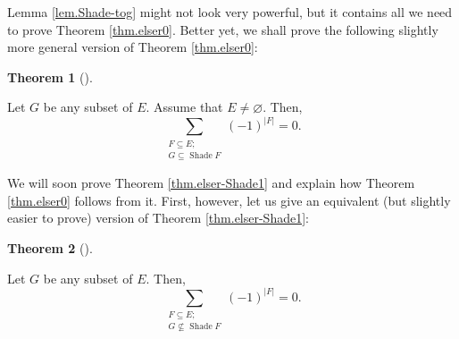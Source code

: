 \documentclass[numbers=enddot,12pt,final,onecolumn]{scrartcl}%
\theoremstyle{definition}
\newtheorem{theo}{Theorem}[section]
\newenvironment{theorem}[1][]
{\begin{theo}[#1]\begin{leftbar}}
{\end{leftbar}\end{theo}}
\let\sumnonlimits\sum
\renewcommand{\sum}{\sumnonlimits\limits}
\begin{document}
Lemma \ref{lem.Shade-tog} might not look very powerful, but it contains all we
need to prove Theorem \ref{thm.elser0}. Better yet, we shall prove the
following slightly more general version of Theorem \ref{thm.elser0}:

\begin{theorem}
\label{thm.elser-Shade1}Let $G$ be any subset of $E$. Assume that
$E\neq\varnothing$. Then,%
\[
\sum_{\substack{F\subseteq E;\\G\subseteq\operatorname*{Shade}F}}\left(
-1\right)  ^{\left\vert F\right\vert }=0.
\]

\end{theorem}

We will soon prove Theorem \ref{thm.elser-Shade1} and explain how Theorem
\ref{thm.elser0} follows from it. First, however, let us give an equivalent
(but slightly easier to prove) version of Theorem \ref{thm.elser-Shade1}:

\begin{theorem}
\label{thm.elser-Shade0}Let $G$ be any subset of $E$. Then,%
\[
\sum_{\substack{F\subseteq E;\\G\not \subseteq \operatorname*{Shade}F}}\left(
-1\right)  ^{\left\vert F\right\vert }=0.
\]

\end{theorem}
\end{document}
